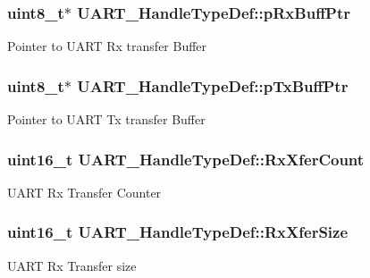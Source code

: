 \subsubsection[{\texorpdfstring{p\+Rx\+Buff\+Ptr}{pRxBuffPtr}}]{\setlength{\rightskip}{0pt plus 5cm}uint8\+\_\+t$\ast$ U\+A\+R\+T\+\_\+\+Handle\+Type\+Def\+::p\+Rx\+Buff\+Ptr}\hypertarget{struct_u_a_r_t___handle_type_def_a9541d846ad12e9376ddd0062efe3196c}{}\label{struct_u_a_r_t___handle_type_def_a9541d846ad12e9376ddd0062efe3196c}
Pointer to U\+A\+RT Rx transfer Buffer 
\subsubsection[{\texorpdfstring{p\+Tx\+Buff\+Ptr}{pTxBuffPtr}}]{\setlength{\rightskip}{0pt plus 5cm}uint8\+\_\+t$\ast$ U\+A\+R\+T\+\_\+\+Handle\+Type\+Def\+::p\+Tx\+Buff\+Ptr}\hypertarget{struct_u_a_r_t___handle_type_def_a79dd401b02d57f1b2d4618744402850c}{}\label{struct_u_a_r_t___handle_type_def_a79dd401b02d57f1b2d4618744402850c}
Pointer to U\+A\+RT Tx transfer Buffer 
\subsubsection[{\texorpdfstring{Rx\+Xfer\+Count}{RxXferCount}}]{\setlength{\rightskip}{0pt plus 5cm}uint16\+\_\+t U\+A\+R\+T\+\_\+\+Handle\+Type\+Def\+::\+Rx\+Xfer\+Count}\hypertarget{struct_u_a_r_t___handle_type_def_ade988f08540556bd89766e4cc2bb4dec}{}\label{struct_u_a_r_t___handle_type_def_ade988f08540556bd89766e4cc2bb4dec}
U\+A\+RT Rx Transfer Counter 
\subsubsection[{\texorpdfstring{Rx\+Xfer\+Size}{RxXferSize}}]{\setlength{\rightskip}{0pt plus 5cm}uint16\+\_\+t U\+A\+R\+T\+\_\+\+Handle\+Type\+Def\+::\+Rx\+Xfer\+Size}\hypertarget{struct_u_a_r_t___handle_type_def_a22782fdbe156661bc9710efd02228746}{}\label{struct_u_a_r_t___handle_type_def_a22782fdbe156661bc9710efd02228746}
U\+A\+RT Rx Transfer size 
